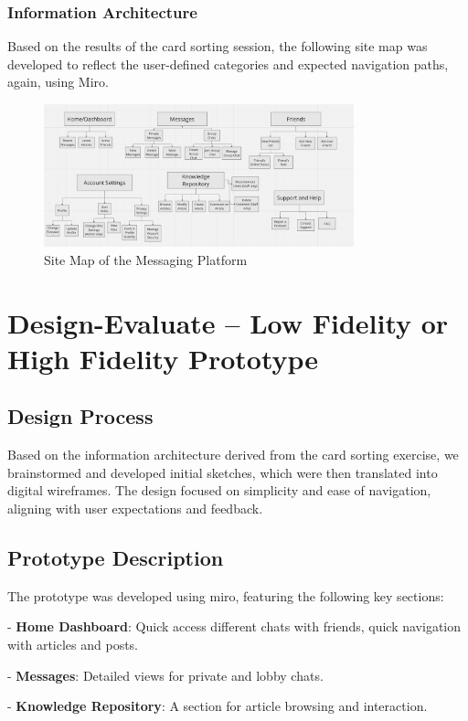 \documentclass[12pt,a4paper]{article}
\begin{document}
\subsubsection*{Information Architecture}
Based on the results of the card sorting session, the following site map was developed to reflect the user-defined categories and expected navigation paths, again, using Miro.

\begin{figure}[H]
\centering
\includegraphics[width=0.8\textwidth]{sitemap.png} %
\caption{Site Map of the Messaging Platform}
\label{fig:sitemap}
\end{figure}

\section{Design-Evaluate – Low Fidelity or High Fidelity Prototype }
\subsection*{Design Process}
Based on the information architecture derived from the card sorting exercise, we brainstormed and developed initial sketches, which were then translated into digital wireframes. The design focused on simplicity and ease of navigation, aligning with user expectations and feedback.

\subsection*{Prototype Description}
The prototype was developed using miro, featuring the following key sections:

- \textbf{Home Dashboard}: Quick access different chats with friends, quick navigation with articles and posts.

- \textbf{Messages}: Detailed views for private and lobby chats.

- \textbf{Knowledge Repository}: A section for article browsing and interaction.
\end{document}
